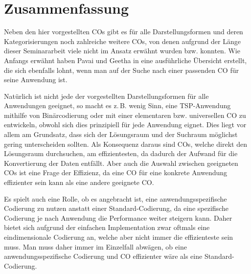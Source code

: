 \documentclass{llncs}
\newcommand{\zB}{z.\,B. }
\begin{document}
	
	
	\section{Zusammenfassung}
	\label{sec:ZusFass}
	
	Neben den hier vorgestellten COs gibt es für alle Darstellungsformen und deren Kategorisierungen noch zahlreiche weitere COs, von denen aufgrund der Länge dieser Seminararbeit viele nicht im Ansatz erwähnt wurden bzw. konnten. Wie Anfangs erwähnt haben Pavai und Geetha in \cite{Survey} eine ausführliche Übersicht erstellt, die sich ebenfalls lohnt, wenn man auf der Suche nach einer passenden CO für seine Anwendung ist.
	
	Natürlich ist nicht jede der vorgestellten Darstellungsformen für alle Anwendungen geeignet, so macht es \zB wenig Sinn, eine TSP-Anwendung mithilfe von Binärcodierung oder mit einer elementaren bzw. universellen CO zu entwickeln, obwohl sich dies prinzipiell für jede Anwendung eignet. Dies liegt vor allem am Grundsatz, dass sich der Lösungsraum und der Suchraum möglichst gering unterscheiden sollten. \cite{TacklingRealCodedGA} Als Konsequenz daraus sind COs, welche direkt den Lösungsraum durchsuchen, am effizientesten, da dadurch der Aufwand für die Konvertierung der Daten entfällt. Aber auch die Auswahl zwischen geeigneten COs ist eine Frage der Effizienz, da eine CO für eine konkrete Anwendung effizienter sein kann als eine andere geeignete CO.
	
	Es spielt auch eine Rolle, ob es angebracht ist, eine anwendungsspezifische Codierung zu nutzen anstatt einer Standard-Codierung, da eine spezifische Codierung je nach Anwendung die Performance weiter steigern kann. Daher bietet sich aufgrund der einfachen Implementation zwar oftmals eine eindimensionale Codierung an, welche aber nicht immer die effizienteste sein muss. Man muss daher immer im Einzelfall abwägen, ob eine anwendungsspezifische Codierung und CO effizienter wäre als eine Standard-Codierung.
	
	\pagebreak
	
	 
	
	
\end{document}
